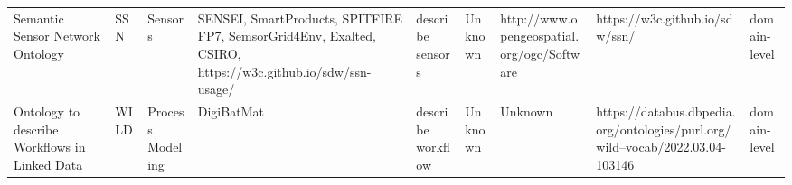 \begin{tabular}{m{5cm}m{2cm}m{5cm}m{2cm}m{2cm}m{2cm}m{2cm}m{2cm}m{2cm}}
                                                 Semantic Sensor Network Ontology &                     SSN &                                     Sensors &                                                                                                                                                                                                                                                            SENSEI, SmartProducts, SPITFIRE FP7, SemsorGrid4Env, Exalted, CSIRO, https://w3c.github.io/sdw/ssn-usage/ &                                                                                                                                                                                                                                                                                                                                                                                       describe sensors &                                                                                                            Unknown &   http://www.opengeospatial.org/ogc/Software &                                                                     https://w3c.github.io/sdw/ssn/ &      domain-level \\
                                    Ontology to describe Workflows in Linked Data &                    WILD &                            Process Modeling &                                                                                                                                                                                                                                                                                                                                                           DigiBatMat &                                                                                                                                                                                                                                                                                                                                                                                      describe workflow &                                                                                                            Unknown &                                      Unknown &                      https://databus.dbpedia.org/ontologies/purl.org/wild--vocab/2022.03.04-103146 &      domain-level \\
\bottomrule
\end{tabular}
